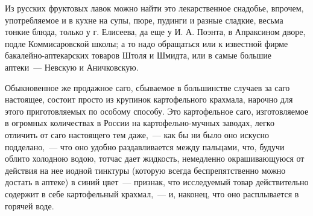 Из русских фруктовых лавок можно найти это лекарственное снадобье, впрочем, употребляемое и в кухне на супы, пюре, пудинги и разные сладкие, весьма тонкие блюда, только у г. Елисеева, да еще у И. А. Поэнта, в Апраксином дворе, подле Коммисаровской школы; а то надо обращаться или к известной фирме бакалейно-аптекарских товаров Штоля и Шмидта, или в самые большие аптеки~--- Невскую и Аничковскую.

Обыкновенное же продажное саго, сбываемое в большинстве случаев за саго настоящее, состоит просто из крупинок картофельного крахмала, нарочно для этого приготовляемых по особому способу. Это картофельное саго, изготовляемое в огромных количествах в России на картофельно-мучных заводах, легко отличить от саго настоящего тем даже,~--- как бы ни было оно искусно подделано,~--- что оно удобно раздавливается между пальцами, что, будучи облито холодною водою, тотчас дает жидкость, немедленно окрашивающуюся от действия на нее иодной тинктуры (которую всегда беспрепятственно можно достать в аптеке) в синий цвет~--- признак, что исследуемый товар действительно содержит в себе картофельный крахмал,~--- и, наконец, что оно расплывается в горячей воде.
